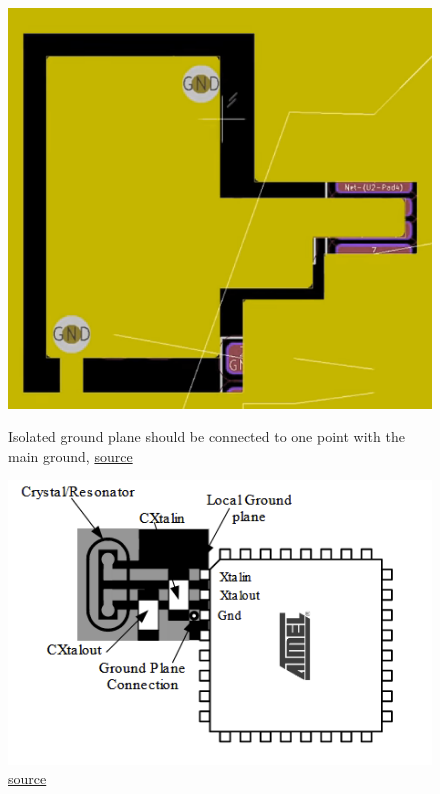 \documentclass[12pt]{article}
\begin{document}
\begin{figure}[h!]
	\centering
	\begin{minipage}[b]{0.3\textwidth}
		\includegraphics[width=\textwidth]{assets/isolated_gnd.png}
		\caption{Isolated ground plane should be connected to one point with the main ground, \href{https://www.youtube.com/watch?v=t5phi3nT8OU&t=4940s}{source}}
	\end{minipage}
	\hfill
	\begin{minipage}[b]{0.3\textwidth}
		\includegraphics[width=\textwidth]{assets/layout_clock.png}
		\caption{\href{http://ww1.microchip.com/downloads/en/DeviceDoc/Atmel-8128-Best-Practices-for-the-PCB-Layout-of-Oscillators_ApplicationNote_AVR186.pdf}{source}}
	\end{minipage}
\end{figure}
\end{document}
